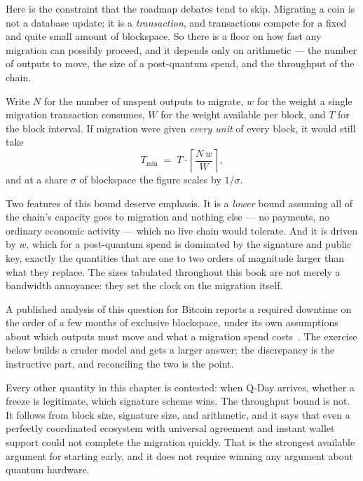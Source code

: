 Here is the constraint that the roadmap debates tend to skip. Migrating a coin is
not a database update; it is a \emph{transaction}, and transactions compete for a
fixed and quite small amount of blockspace. So there is a floor on how fast any
migration can possibly proceed, and it depends only on arithmetic --- the number
of outputs to move, the size of a post-quantum spend, and the throughput of the
chain.

Write $N$ for the number of unspent outputs to migrate, $w$ for the weight a
single migration transaction consumes, $W$ for the weight available per block,
and $T$ for the block interval. If migration were given \emph{every unit} of
every block, it would still take
\[
  T_{\min} \;=\; T \cdot \left\lceil \frac{N\,w}{W} \right\rceil ,
\]
and at a share $\sigma$ of blockspace the figure scales by $1/\sigma$.

Two features of this bound deserve emphasis. It is a \emph{lower} bound assuming
all of the chain's capacity goes to migration and nothing else --- no payments,
no ordinary economic activity --- which no live chain would tolerate. And it is
driven by $w$, which for a post-quantum spend is dominated by the signature and
public key, exactly the quantities that are one to two orders of magnitude larger
than what they replace. The sizes tabulated throughout this book are not merely a
bandwidth annoyance: they set the clock on the migration itself.

A published analysis of this question for Bitcoin reports a required downtime on
the order of a few months of exclusive blockspace, under its own assumptions
about which outputs must move and what a migration spend
costs~\cite{pont2024}. The exercise below builds a cruder model and gets a
larger answer; the discrepancy is the instructive part, and reconciling the two
is the point.

\begin{remark}
Every other quantity in this chapter is contested: when Q-Day arrives, whether a
freeze is legitimate, which signature scheme wins. The throughput bound is not.
It follows from block size, signature size, and arithmetic, and it says that even
a perfectly coordinated ecosystem with universal agreement and instant wallet
support could not complete the migration quickly. That is the strongest available
argument for starting early, and it does not require winning any argument about
quantum hardware.
\end{remark}

